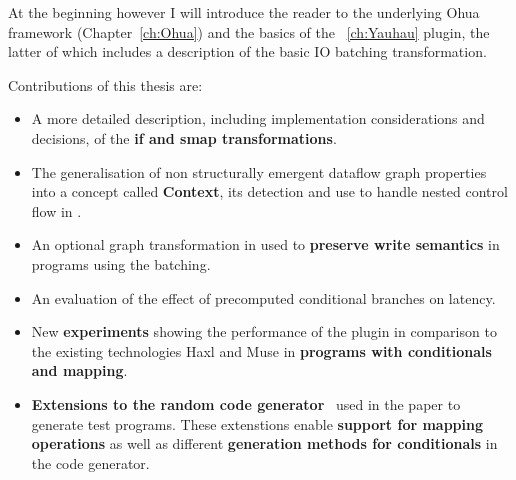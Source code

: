 At the beginning however I will introduce the reader to the underlying Ohua framework (Chapter~\ref{ch:Ohua}) and the basics of the \yauhau{}~\ref{ch:Yauhau} plugin, the latter of which includes a description of the basic IO batching transformation.

Contributions of this thesis are:
\begin{itemize}
    \item A more detailed description, including implementation considerations and decisions, of the \textbf{if and smap transformations}.
    \item The generalisation of non structurally emergent dataflow graph properties into a concept called \textbf{Context}, its detection and use to handle nested control flow in \yauhau{}.
    \item An optional graph transformation in \yauhau{} used to \textbf{preserve write semantics} in programs using the \yauhau{} batching.
    \item An evaluation of the effect of precomputed conditional branches on latency.
    \item New \textbf{experiments} showing the performance of the \yauhau{} plugin in comparison to the existing technologies Haxl and Muse in \textbf{programs with conditionals and mapping}.
    \item \textbf{Extensions to the random code generator}~\cite{Goens-rand-code-graph} used in the \yauhau{} paper to generate test programs.
    These extenstions enable \textbf{support for mapping operations} as well as different \textbf{generation methods for conditionals} in the code generator.
\end{itemize}

